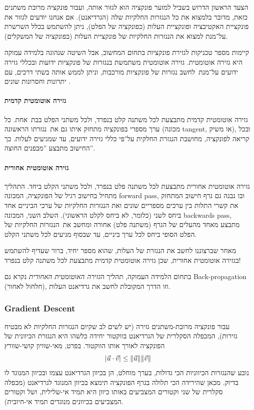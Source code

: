 \documentclass[hebrew, a4paper]{article}
\theoremstyle{plain}
\theoremstyle{definition}
\numberwithin{equation}{section}
\DeclarePairedDelimiter\abs{\lvert}{\rvert}
\DeclarePairedDelimiter\norm{\lVert}{\rVert}
\begin{document}
הצעד הראשון הדרוש בשביל למזער פונקציה הוא לגזור אותה, ועבור פונקציה
מרובת משתנים כזאת, מדובר בלמצוא את כל הנגזרות החלקיות שלה (הגרדיאנט).
אם אנחנו יודעים לגזור את פונקציית האקטיבציה ופונקציית העלות (כפונקציה של
הפלט), ניתן להשתמש בכלל השרשרת על־מנת למצוא את הנגזרות החלקיות של
פונקציית העלות (כפונקציה של המשקלים).

קיימות מספר טכניקות לגזירת פונקציות בתחום המחשוב, אבל השיטה שנהוגה
בלמידה עמוקה היא גזירה אוטומטית. גזירה אוטומטית משתמשת בנגזרות של
פונקציות ידועות ובכללי גזירה ידועים על־מנת~לחשב נגזרות של פונקציות
מורכבות, וניתן לממש אותה בשתי דרכים, עם יתרונות וחסרונות שונים
.

\paragraph{גזירה אוטומטית קדמית}

גזירה אוטומטית קדמית מתבצעת לכל משתנה קלט בנפרד, ולכל משתני הפלט
בבת~אחת. כל ערך מספרי בפונקציה מתחזק איתו גם את~נגזרתו הראשונה (מכונה
tangent, או משיק), ובכל קריאה לפונקציה, מחושבת הנגזרת החלקית על־פי
כללי גזירה ידועים, עד שמגיעים לעלות. כך החישוב מתבצע ”מבפנים החוצה”.

\paragraph{גזירה אוטומטית אחורית}

גזירה אוטומטית אחורית מתבצעת לכל משתנה פלט בנפרד, ולכל משתני הקלט
ביחד. התהליך מתחיל בחישוב רגיל של הפונקציה, המכונה forward pass, ובו
נבנה גם גרף חישוב המתחזק את קשרי התלות בין ערכים מספריים שונים ואת
הנגזרות החלקיות של ערכי הביניים אחד ביחס לשני (כלומר, לא ביחס לקלט
הראשוני). השלב השני, המכונה backwards pass, מתבצע מאחד מהעלים של הגרף
(משתנה פלט) אחורה ומחשב את~הנגזרות החלקיות של הפלט הסופי ביחס לכל ערך
ביניים, עד שבסוף מגיעים לכל משתני הקלט.

מאחר שברצוננו לחשב את הנגזרת של העלות, שהוא מספר יחיד, ברור שעדיף
להשתמש בגזירה אוטומטית אחורית, שכן גזירה אוטומטית קדמית מתבצעת לכל
משתנה קלט בנפרד!

בתחום הלמידה העמוקה, תהליך ה\emph{גזירה האוטומטית האחורית} נקרא גם
Back-propagation (חלחול לאחור), וזו הדרך המקובלת לחשב את גרדיאנט
העלות.

\subsubsection{Gradient Descent}
\label{sec:gradient-descent}

עבור פונקציה מרובת-משתנים גזירה (יש לשים לב שקיום הנגזרות החלקיות לא
מבטיח גזירות), המכפלה הסקלרית של הגרדיאנט בווקטור יחידה כלשהו היא
הנגזרת הכיוונית של הפונקציה לאורך אותו הווקטור. בפרט, מאי-שוויון
קושי-שוורץ
\[
  \abs{\vec{u} \cdot \vec{v}} \leq \norm{\vec{u}}\norm{\vec{v}}
\]
נובע שהנגזרות הכיווניות הכי גדולות, בערך מוחלט, הן בכיוון הגרדיאנט
עצמו ובכיוון המנוגד לו בדיוק. מכאן שהירידה הכי תלולה בגרף הפונקציה
תימצא בכיוון המנוגד לגרדיאנט (מכפלה סקלרית של שני וקטורים המצביעים
באותו כיוון היא תמיד אי-שלילית, ושל וקטורים המצביעים בכיוונים מנוגדים
תמיד אי-חיובית).
\end{document}
